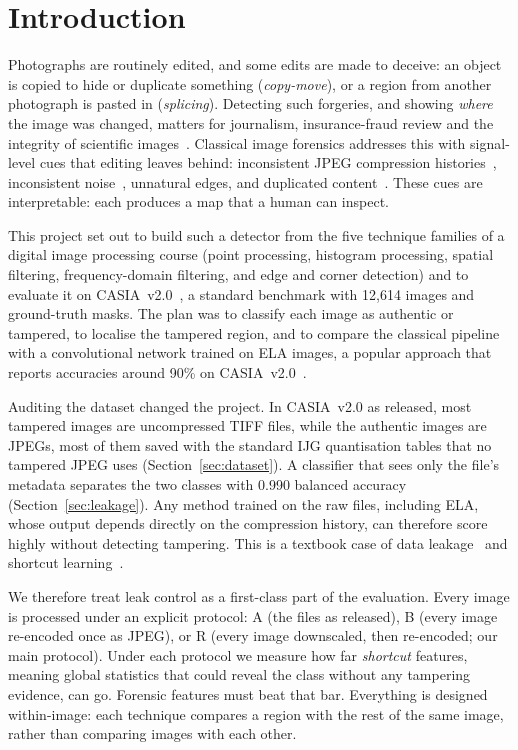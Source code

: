 \section{Introduction}\label{sec:intro}

Photographs are routinely edited, and some edits are made to deceive: an object is copied to hide or duplicate
something (\emph{copy-move}), or a region from another photograph is pasted in (\emph{splicing}). Detecting such
forgeries, and showing \emph{where} the image was changed, matters for journalism, insurance-fraud review and the
integrity of scientific images~\cite{piva2013overview,verdoliva2020overview}. Classical image forensics addresses
this with signal-level cues that editing leaves behind: inconsistent JPEG compression
histories~\cite{krawetz2007ela,farid2009ghost,lin2009dq}, inconsistent noise~\cite{mahdian2009noise}, unnatural
edges, and duplicated content~\cite{fridrich2003copymove,amerini2011sift}. These cues are interpretable: each
produces a map that a human can inspect.

This project set out to build such a detector from the five technique families of a digital image processing
course (point processing, histogram processing, spatial filtering, frequency-domain filtering, and edge and corner
detection) and to evaluate it on CASIA~v2.0~\cite{dong2013casia}, a standard benchmark with 12,614 images and
ground-truth masks. The plan was to classify each image as authentic or tampered, to localise the tampered region,
and to compare the classical pipeline with a convolutional network trained on ELA images, a popular approach that
reports accuracies around 90\% on CASIA~v2.0~\cite{sudiatmika2019ela,ali2022recompress}.

Auditing the dataset changed the project. In CASIA~v2.0 as released, most tampered images are uncompressed TIFF
files, while the authentic images are JPEGs, most of them saved with the standard IJG quantisation tables that no
tampered JPEG uses (Section~\ref{sec:dataset}). A classifier that sees only the file's metadata separates the two
classes with 0.990 balanced accuracy (Section~\ref{sec:leakage}). Any method trained on the raw files, including
ELA, whose output depends directly on the compression history, can therefore score highly without detecting
tampering. This is a textbook case of data leakage~\cite{kaufman2012leakage} and shortcut
learning~\cite{geirhos2020shortcut}.

We therefore treat leak control as a first-class part of the evaluation. Every image is processed under an explicit
protocol: A (the files as released), B (every image re-encoded once as JPEG), or R (every image downscaled, then
re-encoded; our main protocol). Under each protocol we measure how far \emph{shortcut} features, meaning global
statistics that could reveal the class without any tampering evidence, can go. Forensic features must beat that
bar. Everything is designed within-image: each technique compares a region with the rest of the same image, rather
than comparing images with each other.

